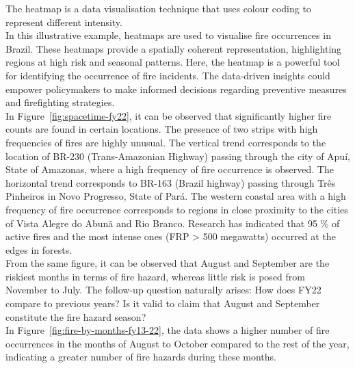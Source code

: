\documentclass{article}\usepackage[]{graphicx}\usepackage[]{xcolor}
\begin{document}
The heatmap is a data visualisation technique that uses colour coding to represent different intensity.\\

\noindent
In this illustrative example, heatmaps are used to visualise fire occurrences in Brazil. These heatmaps provide a spatially coherent representation, highlighting regions at high risk and seasonal patterns. Here, the heatmap is a powerful tool for identifying the occurrence of fire incidents. The data-driven insights could empower policymakers to make informed decisions regarding preventive measures and firefighting strategies.\\

\noindent
In Figure~\ref{fig:spacetime-fy22}, it can be observed that significantly higher fire counts are found in certain locations. The presence of two strips with high frequencies of fires are highly unusual.  The vertical trend corresponds to the location of BR-230 (Trans-Amazonian Highway) passing through the city of Apuí, State of Amazonas, where a high frequency of fire occurrence is observed.  The horizontal trend corresponds to BR-163 (Brazil highway) passing through Três Pinheiros in Novo Progresso, State of Pará. The western coastal area with a high frequency of fire occurrence corresponds to regions in close proximity to the cities of Vista Alegre do Abunã and Rio Branco. Research has indicated that 95 \% of active fires and the most intense ones (FRP > 500 megawatts) occurred at the edges in forests.\\

\noindent
From the same figure, it can be observed that August and September are the riskiest months in terms of fire hazard, whereas little risk is posed from November to July. The follow-up question naturally arises: How does FY22 compare to previous years? Is it valid to claim that August and September constitute the fire hazard season?\\

\noindent
In Figure~\ref{fig:fire-by-months-fy13-22}, the data shows a higher number of fire occurrences in the months of August to October compared to the rest of the year, indicating a greater number of fire hazards during these months.
\end{document}
